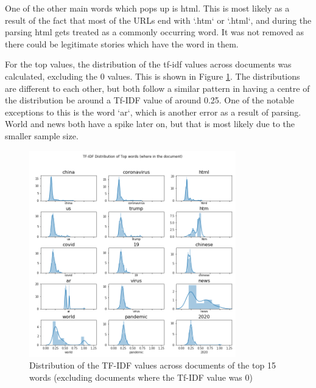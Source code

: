 One of the other main words which pops up is html. This is most likely as a result of the fact that most of the URLs end with `.htm` or `.html`, and during the parsing html gets treated as a commonly occurring word. It was not removed as there could be legitimate stories which have the word in them. 

For the top values, the distribution of the tf-idf values across documents was calculated, excluding the 0 values. This is shown in Figure \ref{fig:tfidfdist}. The distributions are different to each other, but both follow a similar pattern in having a centre of the distribution be around a Tf-IDF value of around 0.25. One of the notable exceptions to this is the word `ar`, which is another error as a result of parsing. World and news both have a spike later on, but that is most likely due to the smaller sample size.

\begin{figure}[H]
	\centering
	\includegraphics[width=0.8\textwidth]{Images/usa_tfidf_top_distribution.png}
	\caption{Distribution of the TF-IDF values across documents of the top 15 words (excluding documents where the Tf-IDF value was 0)}
	\label{fig:tfidfdist}
\end{figure}

